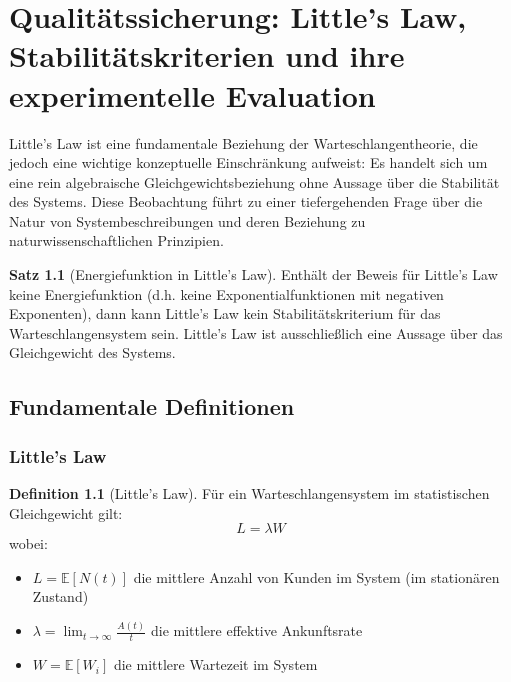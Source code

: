 ﻿\documentclass[a4paper,12pt]{report}
\theoremstyle{definition}
\newtheorem{definition}{Definition}[section]
\newtheorem{satz}{Satz}[section]
\begin{document}

\chapter{Qualitätssicherung: Little's Law, Stabilitätskriterien und ihre experimentelle Evaluation}
\label{ch:qualitaetssicherung}

Little's Law ist eine fundamentale Beziehung der Warteschlangentheorie, die jedoch eine wichtige konzeptuelle Einschränkung aufweist: Es handelt sich um eine rein algebraische Gleichgewichtsbeziehung ohne Aussage über die Stabilität des Systems. Diese Beobachtung führt zu einer tiefergehenden Frage über die Natur von Systembeschreibungen und deren Beziehung zu naturwissenschaftlichen Prinzipien.

\begin{satz}[Energiefunktion in Little's Law]
	Enthält der Beweis für Little's Law keine Energiefunktion (d.h. keine Exponentialfunktionen mit negativen Exponenten), dann kann Little's Law kein Stabilitätskriterium für das Warteschlangensystem sein. Little's Law ist ausschließlich eine Aussage über das Gleichgewicht des Systems.
\end{satz}

\section{Fundamentale Definitionen}

\subsection{Little's Law}

\begin{definition}[Little's Law]
	Für ein Warteschlangensystem im statistischen Gleichgewicht gilt:
	\begin{equation}
		L = \lambda W
	\end{equation}
	wobei:
	\begin{itemize}
		\item[-] $L = \mathbb{E}[N(t)]$ die mittlere Anzahl von Kunden im System (im stationären Zustand)
		\item[-] $\lambda = \lim_{t \to \infty} \frac{A(t)}{t}$ die mittlere effektive Ankunftsrate
		\item[-] $W = \mathbb{E}[W_i]$ die mittlere Wartezeit im System
	\end{itemize}
\end{definition}
\end{document}
